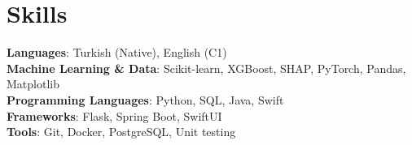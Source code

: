 \section{Skills}
    \begin{itemize}[leftmargin=0.15in, label={}]
	\small{\item{
		\textbf{Languages}{: Turkish (Native), English (C1)} \\
        \textbf{Machine Learning \& Data}{: Scikit-learn, XGBoost, SHAP, PyTorch, Pandas, Matplotlib} \\
        \textbf{Programming Languages}{: Python, SQL, Java, Swift} \\
        \textbf{Frameworks}{: Flask, Spring Boot, SwiftUI} \\
        \textbf{Tools}{: Git, Docker, PostgreSQL, Unit testing} \\
	}}
    \end{itemize}
